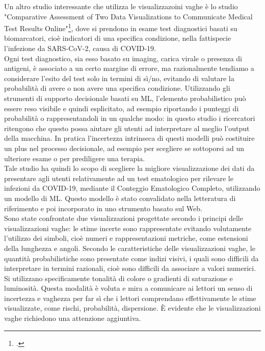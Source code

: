 Un altro studio interessante che utilizza le visualizzazoini vaghe è lo studio "Comparative Assessment of Two Data Visualizations to Communicate Medical Test Results Online"\footcite{womak:comparative-assesment}, dove si prendono in esame test diagnostici basati su biomarcatori, cioè indicatori di una specifica condizione, nella fattispecie l'infezione da SARS-CoV-2, causa di COVID-19.\\
Ogni test diagnostico, sia esso basato su imaging, carica virale o presenza di antigeni, è associato a un certo margine di errore, ma razionalmente tendiamo a considerare l'esito del test solo in termini di sì/no, evitando di valutare la probabilità di avere o non avere una specifica condizione. Utilizzando gli strumenti di supporto decisionale basati su ML, l'elemento probabilistico può essere reso visibile e quindi esplicitato, ad esempio riportando i punteggi di probabilità o rappresentandoli in un qualche modo: in questo studio i ricercatori ritengono che questo possa aiutare gli utenti ad interpretare al meglio l'output della macchina. In pratica l'incertezza intrinseca di questi modelli può costituire un plus nel processo decisionale, ad esempio per scegliere se sottoporsi ad un ulteriore esame o per prediligere una terapia.\\
Tale studio ha quindi lo scopo di scegliere la migliore visualizzazione dei dati da presentare agli utenti relativamente ad un test ematologico per rilevare le infezioni da COVID-19, mediante il Conteggio Ematologico Completo, utilizzando un modello di ML. Questo modello è stato convalidato nella letteratura di riferimento e poi incorporato in uno strumento basato sul Web.\\
Sono state confrontate due visualizzazioni progettate secondo i principi delle visualizzazioni vaghe: le stime incerte sono rappresentate evitando volutamente l'utilizzo dei simboli, cioè numeri e rappresentazioni metriche, come estensioni della lunghezza e angoli. Secondo le caratteristiche delle visualizzazioni vaghe, le quantità probabilistiche sono presentate come indizi visivi, i quali sono difficili da interpretare in termini razionali, cioè sono difficili da associare a valori numerici. Si utilizzano specificamente tonalità di colore o gradienti di saturazione e luminosità. Questa modalità è voluta e mira a comunicare ai lettori un senso di incertezza e vaghezza per far sì che i lettori comprendano effettivamente le stime visualizzate, come rischi, probabilità, dispersione. È evidente che le visualizzazioni vaghe richiedono una attenzione aggiuntiva.\\

